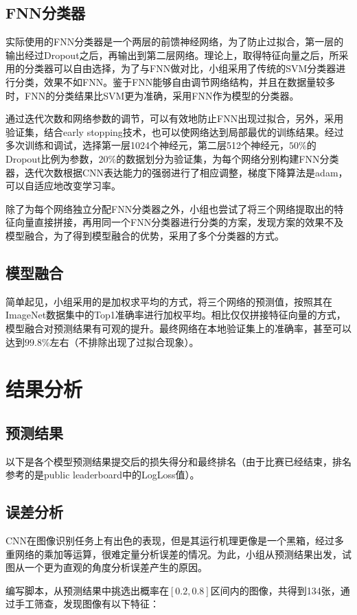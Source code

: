 \documentclass[10.5pt,twocolumn]{jbuaa}
\begin{document}
\subsection{FNN分类器}
实际使用的FNN分类器是一个两层的前馈神经网络，为了防止过拟合，第一层的输出经过Dropout之后，再输出到第二层网络。理论上，取得特征向量之后，所采用的分类器可以自由选择，为了与FNN做对比，小组采用了传统的SVM分类器进行分类，效果不如FNN。鉴于FNN能够自由调节网络结构，并且在数据量较多时，FNN的分类结果比SVM更为准确，采用FNN作为模型的分类器。

通过迭代次数和网络参数的调节，可以有效地防止FNN出现过拟合，另外，采用验证集，结合early stopping技术，也可以使网络达到局部最优的训练结果。经过多次训练和调试，选择第一层1024个神经元，第二层512个神经元，$50\%$的Dropout比例为参数，$20\%$的数据划分为验证集，为每个网络分别构建FNN分类器，迭代次数根据CNN表达能力的强弱进行了相应调整，梯度下降算法是adam，可以自适应地改变学习率。

除了为每个网络独立分配FNN分类器之外，小组也尝试了将三个网络提取出的特征向量直接拼接，再用同一个FNN分类器进行分类的方案，发现方案的效果不及模型融合，为了得到模型融合的优势，采用了多个分类器的方式。
\subsection{模型融合}
简单起见，小组采用的是加权求平均的方式，将三个网络的预测值，按照其在ImageNet数据集中的Top1准确率进行加权平均。相比仅仅拼接特征向量的方式，模型融合对预测结果有可观的提升。最终网络在本地验证集上的准确率，甚至可以达到$99.8\%$左右（不排除出现了过拟合现象）。

\section{结果分析}
\subsection{预测结果}
以下是各个模型预测结果提交后的损失得分和最终排名（由于比赛已经结束，排名参考的是public leaderboard中的LogLoss值）。
\subsection{误差分析}
CNN在图像识别任务上有出色的表现，但是其运行机理更像是一个黑箱，经过多重网络的乘加等运算，很难定量分析误差的情况。为此，小组从预测结果出发，试图从一个更为直观的角度分析误差产生的原因。

编写脚本，从预测结果中挑选出概率在$[0.2,0.8]$区间内的图像，共得到134张，通过手工筛查，发现图像有以下特征：
\end{document}
